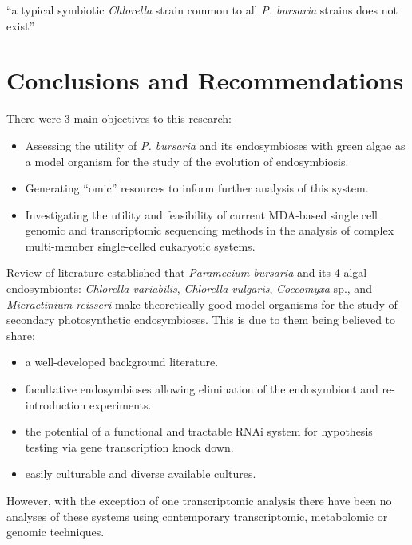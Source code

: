 \graphicspath{{chapters/7.Discussion/figures}}

\begin{savequote}[75mm]
    ``a typical symbiotic \textit{Chlorella} strain common to all \textit{P. bursaria}
    strains does not exist''
\end{savequote}

\chapter{Conclusions and Recommendations}

There were 3 main objectives to this research:
\begin{itemize}
    \item Assessing the utility
of \textit{P. bursaria} and its endosymbioses with green algae
as a model organism for the study of the evolution of endosymbiosis.
    \item Generating ``omic'' resources to inform further analysis of this system.
    \item Investigating the utility and feasibility 
            of current MDA-based
            single cell genomic and transcriptomic sequencing methods in the 
            analysis of complex multi-member single-celled eukaryotic systems.
\end{itemize}


Review of literature established that \textit{Paramecium bursaria} and its
4 algal endosymbionts: \textit{Chlorella variabilis}, \textit{Chlorella vulgaris},
\textit{Coccomyxa} sp., 
and \textit{Micractinium reisseri} make theoretically good model
organisms for the study of secondary photosynthetic endosymbioses.
This is due to them being believed to share:
\begin{itemize}
    \item a well-developed background literature.
    \item facultative endosymbioses allowing elimination of the endosymbiont
        and re-introduction experiments.
    \item the potential of a functional and tractable RNAi system for hypothesis
        testing via gene transcription knock down.
    \item easily culturable and diverse available cultures.
\end{itemize}
However, with the exception of one transcriptomic analysis \citep{Kodama2014} 
there have been no analyses of these systems using 
contemporary transcriptomic, metabolomic or genomic techniques. 


